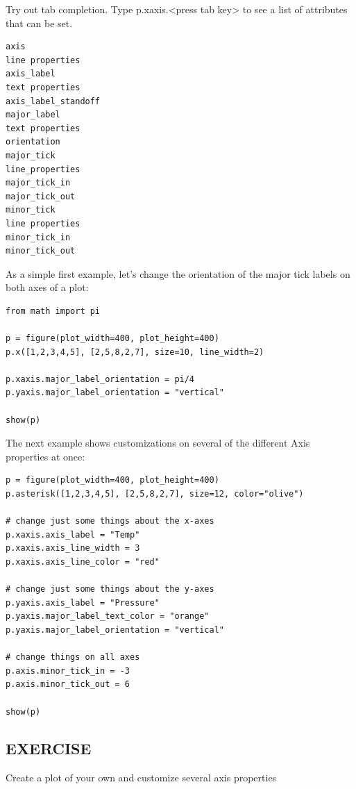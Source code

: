 \documentclass[a4paper,12pt]{article}
\begin{document}
Try out tab completion. Type p.xaxis.<press tab key> to see a list of attributes that can be set.
\begin{framed}
\begin{verbatim}
axis
line properties
axis_label
text properties
axis_label_standoff
major_label
text properties
orientation
major_tick
line_properties
major_tick_in
major_tick_out
minor_tick
line properties
minor_tick_in
minor_tick_out
\end{verbatim}
\end{framed}
As a simple first example, let's change the orientation of the major tick labels on both axes of a plot:
\begin{framed}
	\begin{verbatim}
from math import pi

p = figure(plot_width=400, plot_height=400)
p.x([1,2,3,4,5], [2,5,8,2,7], size=10, line_width=2)

p.xaxis.major_label_orientation = pi/4
p.yaxis.major_label_orientation = "vertical"

show(p)
\end{verbatim}
\end{framed}
The next example shows customizations on several of the different Axis properties at once:
\begin{framed}
	\begin{verbatim}
p = figure(plot_width=400, plot_height=400)
p.asterisk([1,2,3,4,5], [2,5,8,2,7], size=12, color="olive")

# change just some things about the x-axes
p.xaxis.axis_label = "Temp"
p.xaxis.axis_line_width = 3
p.xaxis.axis_line_color = "red"

# change just some things about the y-axes
p.yaxis.axis_label = "Pressure"
p.yaxis.major_label_text_color = "orange"
p.yaxis.major_label_orientation = "vertical"

# change things on all axes
p.axis.minor_tick_in = -3
p.axis.minor_tick_out = 6

show(p)
\end{verbatim}
\end{framed}	
\subsection*{EXERCISE} 
Create a plot of your own and customize several axis properties
\end{document}
